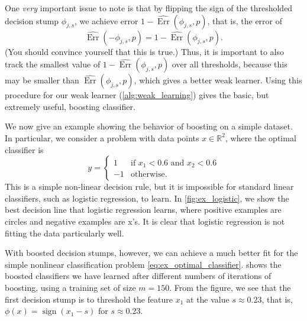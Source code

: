 One \textit{very} important issue to note is that by flipping the sign of the
thresholded decision stump $\phi_{j,s}$, we achieve error $1 - \widehat{\operatorname{Err}}(\phi_{j,s},p)$, that is, the error
of
\[
    \widehat{\operatorname{Err}}(-\phi_{j,s} ,p) = 1 - \widehat{\operatorname{Err}}(\phi_{j,s} ,p).
\]
(You should convince yourself that this is true.) Thus, it is important to also
track the smallest value of $1 - \widehat{\operatorname{Err}}(\phi_{j,s} ,p)$ over all thresholds, because this
may be smaller than $\widehat{\operatorname{Err}}(\phi_{j,s} ,p)$, which gives a better weak learner. Using
this procedure for our weak learner (\cref{alg:weak_learning}) gives the basic, but extremely
useful, boosting classifier.

\begin{example}
We now give an example showing the behavior of boosting on a simple
dataset. In particular, we consider a problem with data points $x \in \mathbb R^2$,
where the optimal classifier is
\begin{equation}\label{eq:ex_optimal_classifier}    
y = \begin{cases}
    1 & \text{if } x_1 < 0.6 \text{ and } x_2 < 0.6\\
    -1 & \text{otherwise.}
\end{cases}
\end{equation}
This is a simple non-linear decision rule, but it is impossible for standard
linear classifiers, such as logistic regression, to learn. In \cref{fig:ex_logistic}, we show
the best decision line that logistic regression learns, where positive examples
are circles and negative examples are x's. It is clear that logistic regression
is not fitting the data particularly well.

With boosted decision stumps, however, we can achieve a much better
fit for the simple nonlinear classification problem \ref{eq:ex_optimal_classifier}.  shows the
boosted classifiers we have learned after different numbers of iterations of
boosting, using a training set of size $m = 150$. From the figure, we see that
the first decision stump is to threshold the feature $x_1$ at the value $s \approx 0.23$,
that is, $\phi(x) = \operatorname{sign}(x_1 - s)$ for $s \approx 0.23$.
\end{example}


